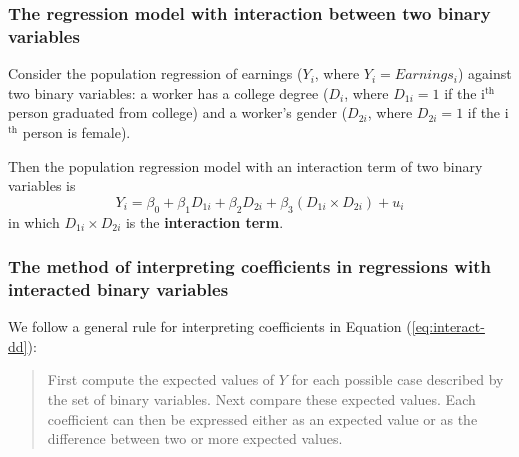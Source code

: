\documentclass[a4paper,11pt]{article}
\begin{document}
\subsubsection*{The regression model with interaction between two binary variables}
\label{sec:orgebf3d1a}

Consider the population regression of earnings (\(Y_i\), where \(Y_i =
Earnings_i\)) against two binary variables: a worker has a college
degree (\(D_i\), where \(D_{1i} = 1\) if the i\(^{\text{th}}\) person graduated from
college) and a worker's gender (\(D_{2i}\), where \(D_{2i} = 1\) if the
i\(^{\text{th}}\) person is female).

Then the population regression model with an interaction term of
two binary variables is
\begin{equation}
\label{eq:interact-dd}
Y_i = \beta_0 + \beta_1 D_{1i} + \beta_2 D_{2i} + \beta_3 (D_{1i} \times D_{2i}) + u_i
\end{equation}
in which \(D_{1i} \times D_{2i}\) is the \textbf{interaction term}.

\subsubsection*{The method of interpreting coefficients in regressions with interacted binary variables}
\label{sec:org9debe52}
We follow a general rule for interpreting coefficients in Equation
(\ref{eq:interact-dd}):
\begin{quote}
First compute the expected values of \(Y\) for each possible case
described by the set of binary variables. Next compare these expected
values. Each coefficient can then be expressed either as an expected
value or as the difference between two or more expected values.
\end{quote}
\end{document}
